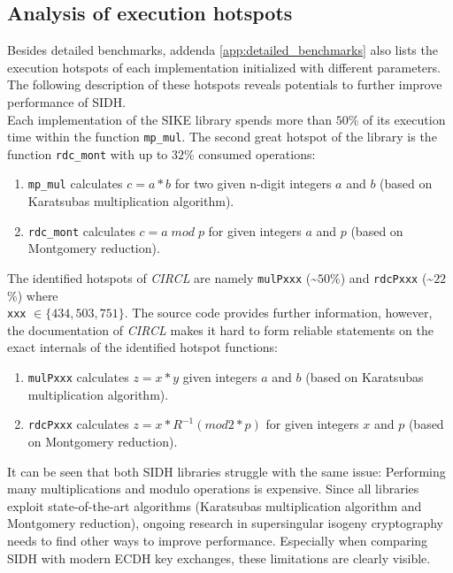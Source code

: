 \subsection{Analysis of execution hotspots}\label{sec:analysis_sidh_hotspots}
Besides detailed benchmarks, addenda \ref{app:detailed_benchmarks} also lists the execution hotspots of each implementation initialized with different parameters. The following description of these hotspots reveals potentials to further improve performance of \gls{SIDH}.\\
Each implementation of the \gls{SIKE} library spends more than $50$\% of its execution time within the function \texttt{mp\_mul}. The second great hotspot of the library is the function \texttt{rdc\_mont} with up to $32$\% consumed operations:
\begin{enumerate}
\item \texttt{mp\_mul} calculates $c=a*b$ for two given n-digit integers $a$ and $b$ (based on Karatsubas multiplication algorithm).
\item \texttt{rdc\_mont} calculates $c = a\;mod\;p$ for given integers $a$ and $p$ (based on Montgomery reduction).
\end{enumerate}
The identified hotspots of \textit{\gls{CIRCL}} are namely \texttt{mulPxxx} (\textasciitilde $50$\%) and \texttt{rdcPxxx} (\textasciitilde $22$\%) where \\\texttt{xxx} $\in \{434, 503, 751\}$. The source code provides further information, however, the documentation of \textit{\gls{CIRCL}} makes it hard to form reliable statements on the exact internals of the identified hotspot functions:
\begin{enumerate}
\item \texttt{mulPxxx} calculates $z=x*y$ given integers $a$ and $b$ (based on Karatsubas multiplication algorithm).
\item \texttt{rdcPxxx} calculates $z = x*R^{-1} (mod 2*p)$ for given integers $x$ and $p$ (based on Montgomery reduction).
\end{enumerate}
It can be seen that both \gls{SIDH} libraries struggle with the same issue: Performing many multiplications and modulo operations is expensive. Since all libraries exploit state-of-the-art algorithms (Karatsubas multiplication algorithm and Montgomery reduction), ongoing research in supersingular isogeny cryptography needs to find other ways to improve performance. Especially when comparing \gls{SIDH} with modern \gls{ECDH} key exchanges, these limitations are clearly visible.

